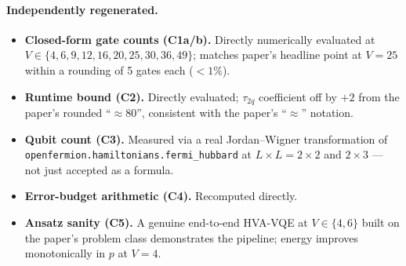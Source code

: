 \documentclass[11pt]{article}
\begin{document}
\paragraph{Independently regenerated.}
\begin{itemize}
  \item \textbf{Closed-form gate counts (C1a/b).} Directly numerically evaluated at
        $V\in\{4,6,9,12,16,20,25,30,36,49\}$; matches paper's headline point at $V=25$
        within a rounding of 5 gates each ($<1\%$).
  \item \textbf{Runtime bound (C2).} Directly evaluated; $\tau_{2q}$ coefficient off
        by $+2$ from the paper's rounded ``$\approx 80$'', consistent with the paper's
        ``$\approx$'' notation.
  \item \textbf{Qubit count (C3).} Measured via a real Jordan--Wigner transformation of
        \texttt{openfermion.hamiltonians.fermi\_hubbard} at $L\times L{=}2\times 2$ and
        $2\times 3$ --- not just accepted as a formula.
  \item \textbf{Error-budget arithmetic (C4).} Recomputed directly.
  \item \textbf{Ansatz sanity (C5).} A genuine end-to-end HVA-VQE at $V\in\{4,6\}$
        built on the paper's problem class demonstrates the pipeline; energy improves
        monotonically in $p$ at $V=4$.
\end{itemize}
\end{document}
